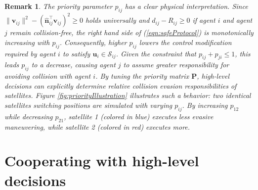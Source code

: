 \documentclass{ifacconf}
\newtheorem{remark}{Remark}
\begin{document}
\begin{remark}
   The priority parameter $p_{ij}$ has a clear physical interpretation.
   Since $\|\boldsymbol{v}_{ij}\|^2 -  (\hat{\boldsymbol{n}}_{ij}^{\top}\boldsymbol{v}_{ij} )^2  \ge 0$ holds universally and $d_{ij} - R_{ij} \ge 0$ if agent $i$ and agent $j$ remain collision-free, the right hand side of (\ref{eqn:safeProtocol}) is monotonically increasing with $p_{ij}$.
   Consequently, higher $p_{ij}$ lowers the control modification required by agent $i$ to satisfy $\boldsymbol{u}_i \in \mathcal{S}_{ij}$.
   Given the constraint that $p_{ij} + p_{ji} \le 1$, this leads $p_{ij}$ to a decrease, causing agent $j$ to assume greater responsibility for avoiding collision with agent $i$.
   By tuning the priority matrix $\boldsymbol{P}$, high-level decisions can explicitly determine relative collision evasion responsibilities of satellites.
   Figure \ref{fig:priorityIllustration} illustrates  such a behavior: two identical satellites switching positions are simulated with varying $p_{ij}$.
   By increasing $p_{12}$ while decreasing $p_{21}$, satellite 1 (colored in blue) executes less evasive maneuvering, while satellite 2 (colored in red) executes more.
\end{remark}

\section{Cooperating with high-level decisions}\label{sec:decision}
\end{document}
